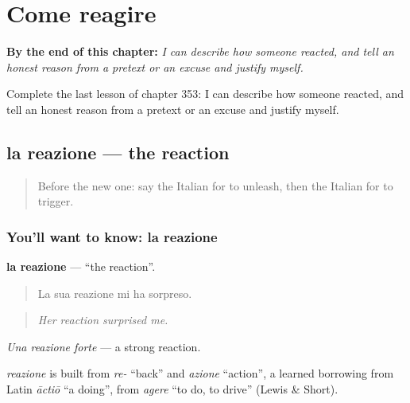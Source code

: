 
\chapter{Come reagire}
\label{ch:it-come-reagire}

\begin{chapteropening}
\textbf{By the end of this chapter:} \emph{I can describe how someone reacted, and tell an honest reason from a pretext or an excuse and justify myself.}

Complete the last lesson of chapter 353: I can describe how someone reacted, and tell an honest reason from a pretext or an excuse and justify myself.
\end{chapteropening}

\section[la reazione]{la reazione — the reaction}

\label{lesson:IT-C353-reazione}



\begin{quote}
Before the new one: say the Italian for to unleash, then the Italian for to trigger.
\end{quote}

\subsection*{You'll want to know: la reazione}
\textbf{la reazione} — \textquotedblleft{}the reaction\textquotedblright{}.

\begin{quote}
La sua reazione mi ha sorpreso.
\end{quote}

\begin{quote}
\emph{Her reaction surprised me.}
\end{quote}

\emph{Una reazione forte} — a strong reaction.

\begin{cousinweb}
\emph{reazione} is built from \emph{re-} \textquotedblleft{}back\textquotedblright{} and \emph{azione} \textquotedblleft{}action\textquotedblright{}, a learned borrowing from Latin \emph{āctiō} \textquotedblleft{}a doing\textquotedblright{}, from \emph{agere} \textquotedblleft{}to do, to drive\textquotedblright{} (Lewis \& Short).
\end{cousinweb}

